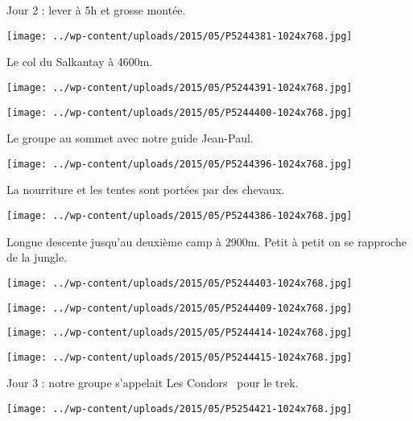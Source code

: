 Jour 2 : lever à 5h et grosse montée. 
\begin{center} \texttt{[image: ../wp-content/uploads/2015/05/P5244381-1024x768.jpg]} \end{center}
\pagebreak

Le col du Salkantay à 4600m.
\begin{center} \texttt{[image: ../wp-content/uploads/2015/05/P5244391-1024x768.jpg]} \end{center}
\begin{center} \texttt{[image: ../wp-content/uploads/2015/05/P5244400-1024x768.jpg]} \end{center}
\pagebreak

Le groupe au sommet avec notre guide Jean-Paul. 
\begin{center} \texttt{[image: ../wp-content/uploads/2015/05/P5244396-1024x768.jpg]} \end{center}

La nourriture et les tentes sont portées par des chevaux. 
\begin{center} \texttt{[image: ../wp-content/uploads/2015/05/P5244386-1024x768.jpg]} \end{center}
\pagebreak

Longue descente jusqu'au deuxième camp à 2900m. Petit à petit on se rapproche de la jungle. 
\begin{center} \texttt{[image: ../wp-content/uploads/2015/05/P5244403-1024x768.jpg]} \end{center}
\begin{center} \texttt{[image: ../wp-content/uploads/2015/05/P5244409-1024x768.jpg]} \end{center}

\begin{center} \texttt{[image: ../wp-content/uploads/2015/05/P5244414-1024x768.jpg]} \end{center}
\begin{center} \texttt{[image: ../wp-content/uploads/2015/05/P5244415-1024x768.jpg]} \end{center}
\pagebreak

Jour 3 : notre groupe s'appelait \og Les Condors \fg\ pour le trek. 
\begin{center} \texttt{[image: ../wp-content/uploads/2015/05/P5254421-1024x768.jpg]} \end{center}

